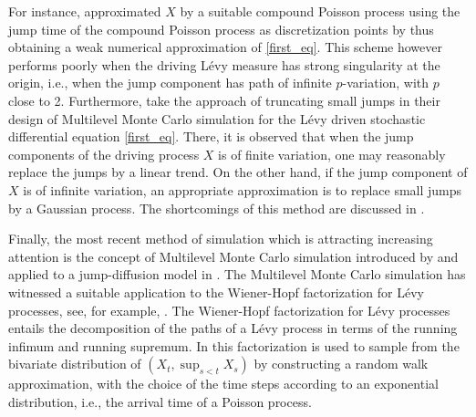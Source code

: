 For instance,  approximated $X$ by a suitable compound Poisson process using the jump time of the compound Poisson process as discretization points by thus obtaining a weak numerical approximation of \eqref{first_eq}. This scheme however performs poorly when the driving  L\'evy measure has strong singularity at the origin, i.e., when the jump component has path of infinite $p$-variation, with $p$ close to 2.
Furthermore,  take the approach of truncating small jumps in their design of Multilevel Monte Carlo simulation for the L\'evy driven stochastic differential equation \eqref{first_eq}. There, it is observed that when the jump components of the driving process $X$ is of finite variation, one may reasonably replace the jumps by a linear trend. On the other hand, if the jump component of $X$ is of infinite variation, an appropriate approximation is to replace small jumps by a Gaussian process. The shortcomings of this method are discussed in .

Finally, the most recent method of simulation which is attracting increasing attention is the concept of Multilevel Monte Carlo simulation introduced by  and applied to a jump-diffusion model in . The Multilevel Monte Carlo simulation has witnessed a suitable application to the Wiener-Hopf factorization for L\'evy processes, see, for example, . The Wiener-Hopf factorization for L\'evy processes entails the decomposition of the paths of a L\'evy process in terms of the running infimum and running supremum. In   this factorization is used to sample from the bivariate distribution of $(X_t, \sup_{s<t}X_s)$ by constructing a random walk approximation, with the choice of the time steps according to an exponential distribution, i.e., the arrival time of a Poisson process.\newpage

